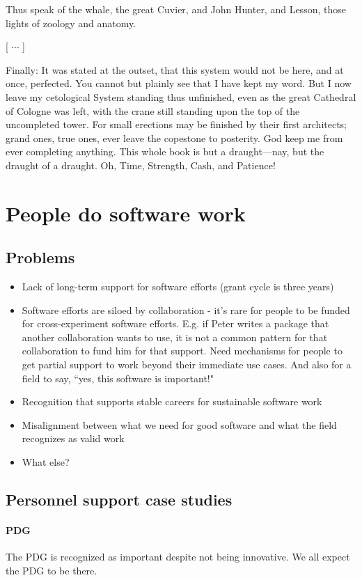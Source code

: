 Thus speak of the whale, the great Cuvier, and John Hunter, and Lesson, those lights of zoology and anatomy.

[ $\cdots$ ]

Finally: It was stated at the outset, that this system would not be here, and at once, perfected. You cannot but plainly see that I have kept my word. But I now leave my cetological System standing thus unfinished, even as the great Cathedral of Cologne was left, with the crane still standing upon the top of the uncompleted tower. For small erections may be finished by their first architects; grand ones, true ones, ever leave the copestone to posterity. God keep me from ever completing anything. This whole book is but a draught---nay, but the draught of a draught. Oh, Time, Strength, Cash, and Patience!

\section{People do software work} 

\subsection{Problems}
\begin{itemize}
    \item Lack of long-term support for software efforts (grant cycle is three years)
    \item Software efforts are siloed by collaboration - it's rare for people to be funded for cross-experiment software efforts.  E.g. if Peter writes a package that another collaboration wants to use, it is not a common pattern for that collaboration to fund him for that support.  Need mechanisms for people to get partial support to work beyond their immediate use cases.  And also for a field to say, ``yes, this software is important!"
    \item Recognition that supports stable careers for sustainable software work
    \item Misalignment between what we need for good software and what the field recognizes as valid work
    \item What else?
\end{itemize}


\subsection{Personnel support case studies}
\paragraph{PDG}
The PDG is recognized as important despite not being innovative.  We all expect the PDG to be there.

